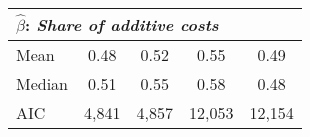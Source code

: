 \begin{tabular}{l|cccc}
\multicolumn{5}{l}{\hspace{1em}$\widehat{\beta}$:  \textit{Share of additive costs}}  \\ \hline
\multicolumn{1}{l}{\hspace{2em}Mean} &
  \multicolumn{1}{|c}{0.48} &
  \multicolumn{1}{c}{0.52} &
  \multicolumn{1}{c}{0.55} &
  \multicolumn{1}{c}{0.49} \\
\multicolumn{1}{l}{\hspace{2em}Median} &
  \multicolumn{1}{|c}{0.51} &
  \multicolumn{1}{c}{0.55} &
  \multicolumn{1}{|c}{0.58} &
  \multicolumn{1}{c}{0.48} \\ \hline
\multicolumn{1}{l}{\hspace{1em}AIC} &
  \multicolumn{1}{|c}{4,841} &
  \multicolumn{1}{c}{4,857} &
  \multicolumn{1}{|c}{12,053} &
  \multicolumn{1}{c}{12,154} \\
\cline{1-5}
\end{tabular}
